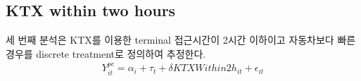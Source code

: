 \documentclass[a4paper, 10pt]{article}
\begin{document}
            \begin{table}[H]
                \centering
                \caption{Per-Capita Outcome, Travel-Time Saving: 의사}
                
            \end{table}

        \subsection{KTX within two hours}
            세 번째 분석은 KTX를 이용한 terminal 접근시간이 2시간 이하이고 자동차보다
            빠른 경우를 discrete treatment로 정의하여 추정한다.
            \begin{align*}
                Y^{pc}_{it}
                =
                \alpha_i + \tau_t
                + \delta KTXWithin2h_{it}
                + \epsilon_{it}
            \end{align*}

            \begin{table}[H]
                \centering
                \caption{Per-Capita Outcome, KTX Within Two Hours: 의원}
                
            \end{table}

            \begin{table}[H]
                \centering
                \caption{Per-Capita Outcome, KTX Within Two Hours: 병원}
                
            \end{table}

            \begin{table}[H]
                \centering
                \caption{Per-Capita Outcome, KTX Within Two Hours: 종합병원}
                
            \end{table}

            \begin{table}[H]
                \centering
                \caption{Per-Capita Outcome, KTX Within Two Hours: 상급종합병원}
                
            \end{table}

            \begin{table}[H]
                \centering
                \caption{Per-Capita Outcome, KTX Within Two Hours: 의사}
                
            \end{table}
\end{document}

